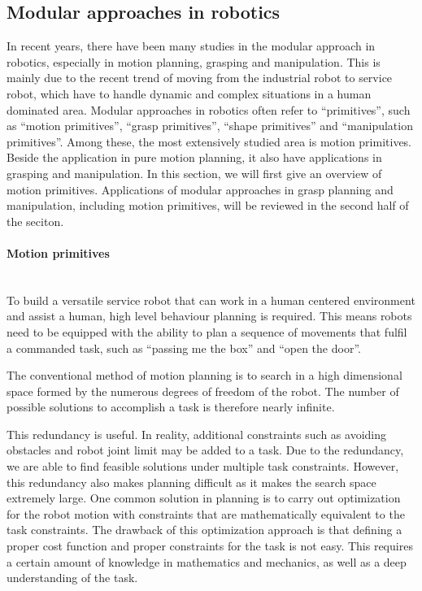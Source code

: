 





\subsection{Modular approaches in robotics}
\label{cha2:sec3:robotics}
In recent years, there have been many studies in the modular approach in robotics, especially in motion planning, grasping and manipulation. This is mainly due to the recent trend of moving from the industrial robot to service robot, which have to handle dynamic and complex situations in a human dominated area.
Modular approaches in robotics often refer to ``primitives'', such as ``motion primitives'', ``grasp primitives'', ``shape primitives'' and ``manipulation primitives''. Among these, the most extensively studied area is motion primitives. Beside the application in pure motion planning, it also have applications in grasping and manipulation.
In this section, we will first give an overview of motion primitives. Applications of modular approaches in grasp planning and manipulation, including motion primitives, will be reviewed in the second half of the seciton.


\paragraph{Motion primitives}
\label{cha2:sec3:robotics:motionprimitives}
~\\
To build a versatile service robot that can work in a human centered environment and assist a human, high level behaviour planning is required. This means robots need to be equipped with the ability to plan a sequence of movements that fulfil a commanded task, such as ``passing me the box'' and ``open the door''.

The conventional method of motion planning is to search in a high dimensional space formed by the numerous degrees of freedom of the robot. The number of possible solutions to accomplish a task is therefore nearly infinite.

This redundancy is useful. In reality, additional constraints such as avoiding obstacles and robot joint limit may be added to a task. Due to the redundancy, we are able to find feasible solutions under multiple task constraints. However, this redundancy also makes planning difficult as it makes the search space extremely large. One common solution in planning is to carry out optimization for the robot motion with constraints that are mathematically equivalent to the task constraints.
The drawback of this optimization approach is that defining a proper cost function and proper constraints for the task is not easy. This requires a certain amount of knowledge in mathematics and mechanics, as well as a deep understanding of the task.

